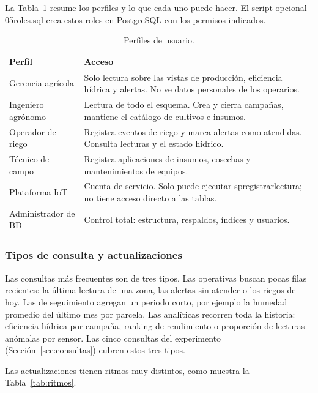 \documentclass[11pt,letterpaper]{article}
\newcommand{\tbus}{\textunderscore\allowbreak}
\newcommand{\tb}[1]{{\ttfamily\let\_\tbus #1}}
\begin{document}
La Tabla~\ref{tab:usuarios} resume los perfiles y lo que cada uno puede hacer. El script opcional \tb{05\_roles.sql} crea estos roles en PostgreSQL con los permisos indicados.

\begin{table}[H]
\centering\small
\begin{tabularx}{\textwidth}{>{\raggedright\arraybackslash}p{3.1cm}X}
\toprule
\textbf{Perfil} & \textbf{Acceso} \\
\midrule
Gerencia agrícola & Solo lectura sobre las vistas de producción, eficiencia hídrica y alertas. No ve datos personales de los operarios. \\
Ingeniero agrónomo & Lectura de todo el esquema. Crea y cierra campañas, mantiene el catálogo de cultivos e insumos. \\
Operador de riego & Registra eventos de riego y marca alertas como atendidas. Consulta lecturas y el estado hídrico. \\
Técnico de campo & Registra aplicaciones de insumos, cosechas y mantenimientos de equipos. \\
Plataforma IoT & Cuenta de servicio. Solo puede ejecutar \tb{sp\_registrar\_lectura}; no tiene acceso directo a las tablas. \\
Administrador de BD & Control total: estructura, respaldos, índices y usuarios. \\
\bottomrule
\end{tabularx}
\caption{Perfiles de usuario.}
\label{tab:usuarios}
\end{table}

\subsubsection{Tipos de consulta y actualizaciones}

Las consultas más frecuentes son de tres tipos. Las operativas buscan pocas filas recientes: la última lectura de una zona, las alertas sin atender o los riegos de hoy. Las de seguimiento agregan un periodo corto, por ejemplo la humedad promedio del último mes por parcela. Las analíticas recorren toda la historia: eficiencia hídrica por campaña, ranking de rendimiento o proporción de lecturas anómalas por sensor. Las cinco consultas del experimento (Sección~\ref{sec:consultas}) cubren estos tres tipos.

Las actualizaciones tienen ritmos muy distintos, como muestra la Tabla~\ref{tab:ritmos}.
\end{document}
